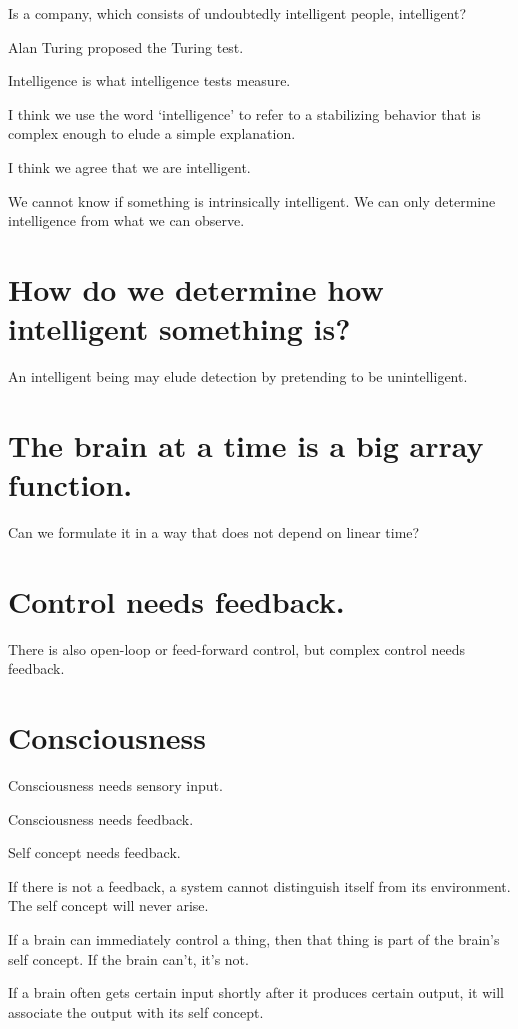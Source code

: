 Is a company, which consists of undoubtedly intelligent people, intelligent?

Alan Turing proposed the Turing test.

Intelligence is what intelligence tests measure.

I think we use the word `intelligence' to refer to a stabilizing behavior
that is complex enough to elude a simple explanation.

I think we agree that we are intelligent.

We cannot know if something is intrinsically intelligent.
We can only determine intelligence from what we can observe.

\section{How do we determine how intelligent something is?}

An intelligent being may elude detection by pretending to be unintelligent.

\section{The brain at a time is a big array function.}

Can we formulate it in a way that does not depend on linear time?

\section{Control needs feedback.}

There is also open-loop or feed-forward control,
but complex control needs feedback.

\section{Consciousness}

Consciousness needs sensory input.

Consciousness needs feedback.

Self concept needs feedback.

If there is not a feedback, a system cannot distinguish itself from its environment.
The self concept will never arise.

If a brain can immediately control a thing,
then that thing is part of the brain's self concept.
If the brain can't, it's not.

If a brain often gets certain input shortly after it produces certain output,
it will associate the output with its self concept.

